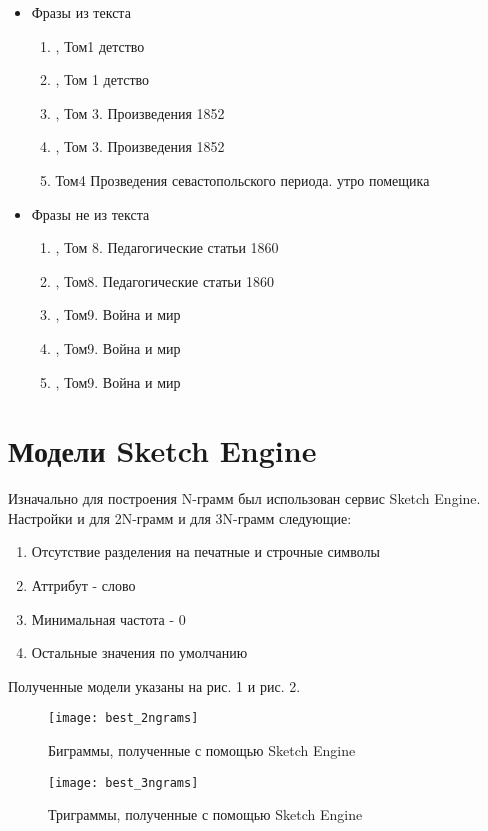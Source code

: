 \documentclass[a4paper,12pt]{article}
\begin{document}
\begin{itemize}
\item Фразы из текста
\begin{enumerate}
\item {}, Том1 детство
\item {}, Том 1 детство
\item {}, Том 3. Произведения 1852
\item {}, Том 3. Произведения 1852
\item {} Том4 Прозведения севастопольского периода. утро помещика
\end{enumerate}
\item Фразы не из текста
\begin{enumerate}
\item {}, Том 8. Педагогические статьи 1860
\item {}, Том8. Педагогические статьи 1860
\item {}, Том9. Война и мир
\item {}, Том9. Война и мир
\item {}, Том9. Война и мир
\end{enumerate}
\end{itemize}



\section{Модели Sketch Engine}
Изначально для построения N-грамм был использован сервис Sketch Engine. Настройки и для 2N-грамм и для 3N-грамм следующие:
\begin{enumerate}
\item Отсутствие разделения на печатные и строчные символы
\item Аттрибут - слово
\item Минимальная частота - 0
\item Остальные значения по умолчанию
\end{enumerate}
Полученные модели указаны на рис. 1 и рис. 2.
\begin{figure}[H]
\caption{Биграммы, полученные с помощью Sketch Engine}
\centering
\texttt{[image: best\_2ngrams]}
\end{figure}
\begin{figure}[H]
\caption{Триграммы, полученные с помощью Sketch Engine}
\centering
\texttt{[image: best\_3ngrams]}
\end{figure}
\end{document}
